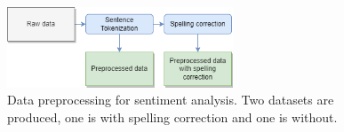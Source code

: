 \begin{figure}[h]
    \centering
    \includegraphics[width=0.6\textwidth]{resources/preprocessing_sentiment_analysis.png}
    \caption{Data preprocessing for sentiment analysis. Two datasets are produced, one is with spelling correction and one is without.}
    \label{fig:preprocessing_sentiment_analysis}
\end{figure}